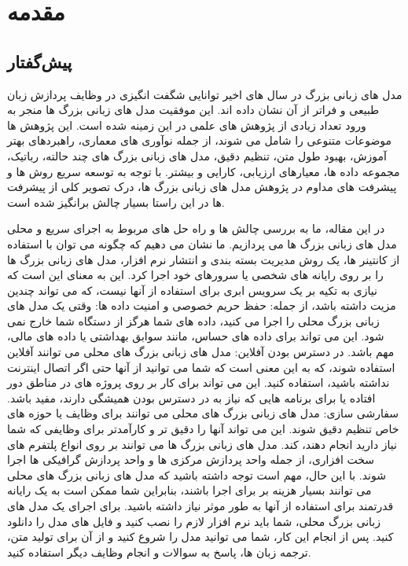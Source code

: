 \chapter{مقدمه}
\section{پیش‌گفتار}

مدل های زبانی بزرگ  \cite{min2023recent} در سال های اخیر توانایی شگفت انگیزی در وظایف پردازش زبان طبیعی و فراتر از آن نشان داده اند. این موفقیت مدل های زبانی بزرگ  ها منجر به ورود تعداد زیادی از پژوهش های علمی در این زمینه شده است. این پژوهش ها موضوعات متنوعی را شامل می شوند، از جمله نوآوری های معماری، راهبردهای بهتر آموزش، بهبود طول متن، تنظیم دقیق، مدل های زبانی بزرگ  های چند حالته، رباتیک، مجموعه داده ها، معیارهای ارزیابی، کارایی و بیشتر. با توجه به توسعه سریع روش ها و پیشرفت های مداوم در پژوهش مدل های زبانی بزرگ  ها، درک تصویر کلی از پیشرفت ها در این راستا بسیار چالش برانگیز شده است.

در این مقاله، ما به بررسی چالش ها و راه حل های مربوط به اجرای سریع و محلی مدل های زبانی بزرگ  ها می پردازیم. ما نشان می دهیم که چگونه می توان با استفاده از کانتینر ها، یک روش مدیریت بسته بندی و انتشار نرم افزار، مدل های زبانی بزرگ  ها را بر روی رایانه های شخصی یا سرورهای خود اجرا کرد. این به معنای این است که نیازی به تکیه بر یک سرویس ابری برای استفاده از آنها نیست، که می تواند چندین مزیت داشته باشد، از جمله: حفظ حریم خصوصی و امنیت داده ها: وقتی یک مدل های زبانی بزرگ  محلی را اجرا می کنید، داده های شما هرگز از دستگاه شما خارج نمی شود. این می تواند برای داده های حساس، مانند سوابق بهداشتی یا داده های مالی، مهم باشد. در دسترس بودن آفلاین: مدل های زبانی بزرگ  های محلی می توانند آفلاین استفاده شوند، که به این معنی است که شما می توانید از آنها حتی اگر اتصال اینترنت نداشته باشید، استفاده کنید. این می تواند برای کار بر روی پروژه های در مناطق دور افتاده یا برای برنامه هایی که نیاز به در دسترس بودن همیشگی دارند، مفید باشد. سفارشی سازی: مدل های زبانی بزرگ  های محلی می توانند برای وظایف یا حوزه های خاص تنظیم دقیق شوند. این می تواند آنها را دقیق تر و کارآمدتر برای وظایفی که شما نیاز دارید انجام دهند، کند. مدل های زبانی بزرگ  ها می توانند بر روی انواع پلتفرم های سخت افزاری، از جمله واحد پردازش مرکزی  ها و واحد پردازش گرافیکی  ها اجرا شوند. با این حال، مهم است توجه داشته باشید که مدل های زبانی بزرگ  های محلی می توانند بسیار هزینه بر برای اجرا باشند، بنابراین شما ممکن است به یک رایانه قدرتمند برای استفاده از آنها به طور موثر نیاز داشته باشید. برای اجرای یک مدل های زبانی بزرگ  محلی، شما باید نرم افزار لازم را نصب کنید و فایل های مدل را دانلود کنید. پس از انجام این کار، شما می توانید مدل را شروع کنید و از آن برای تولید متن، ترجمه زبان ها، پاسخ به سوالات و انجام وظایف دیگر استفاده کنید. 